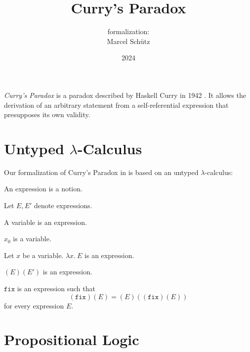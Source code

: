 \documentclass{article}
\title{Curry's Paradox}
\author{\Naproche formalization:\\[0.5em]Marcel Schütz}
\date{2024}
\newcommand{\varzero}{x_0}
\newcommand{\abs}[2]{\lambda#1.\ #2}
\newcommand{\app}[2]{(#1)(#2)}
\newcommand{\fix}{\texttt{fix}}
\begin{document}
  \maketitle

  \noindent \emph{Curry's Paradox} is a paradox described by Haskell Curry in 
  1942 \cite{Curry1942}.
  It allows the derivation of an arbitrary statement from a self-referential 
  expression that presupposes its own validity.

  \section*{Untyped $\lambda$-Calculus}

  \noindent Our formalization of Curry's Paradox in \Naproche is based on an 
  untyped $\lambda$-calculus:

  \begin{forthel}

    \begin{signature*}
      An expression is a notion.
    \end{signature*}
  
    Let $E, E'$ denote expressions.
  
    \begin{signature*}
      A variable is an expression.
    \end{signature*}
  
    \begin{signature*}
      $\varzero$ is a variable.
    \end{signature*}
  
    \begin{signature*}[Abstraction]\label{abstraction}
      Let $x$ be a variable.
      $\abs{x}{E}$ is an expression.
    \end{signature*}
  
    \begin{signature*}[Application]\label{application}
      $\app{E}{E'}$ is an expression.
    \end{signature*}
  
    \begin{signature*}\label{fixed_point_combinator}
      $\fix$ is an expression such that
      \[\app{\fix}{E} = \app{E}{\app{\fix}{E}}\]
      for every expression $E$.
    \end{signature*}
  \end{forthel}


  \section*{Propositional Logic}
\end{document}
